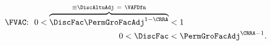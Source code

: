   \begin{equation}\label{eq:FVAC}
    \begin{split}
\text{{\FVAC}:~~}      0 < \overbrace{\DiscFac \PermGroFacAdj^{1-\CRRA} }^{\equiv \DiscAltuAdj~=~\text{\VAFDfn}}  & < 1 \phantom{\text{{\FVAC}:~~}}
      \\ 0 < \DiscFac  & < \PermGroFacAdj^{\CRRA-1} .
    \end{split}
  \end{equation}
